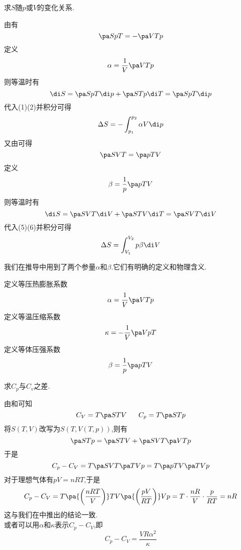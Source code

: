 \documentclass{ctexart}
\begin{document}
\begin{problem}[3F.2.4]
    求$S$随$p$或$V$的变化关系.
\end{problem}
\begin{solution}\setcounter{equation}{0}
    由有
    \begin{equation}
        \pa SpT=-\pa VTp
    \end{equation}
    定义
    \begin{equation}
        \alpha=\dfrac1V\pa VTp
    \end{equation}
    则等温时有
    \begin{equation}
        \di S=\pa SpT\di p+\pa STp\di T=\pa SpT\di p
    \end{equation}
    代入(1)(2)并积分可得
    \begin{equation}
        \Delta S=-\int_{p_1}^{p_2}\alpha V\di p
    \end{equation}
    又由可得
    \begin{equation}
        \pa SVT=\pa pTV
    \end{equation}
    定义
    \begin{equation}
        \beta=\dfrac1p\pa pTV
    \end{equation}
    则等温时有
    \begin{equation}
        \di S=\pa SVT\di V+\pa STV\di T=\pa SVT\di V
    \end{equation}
    代入(5)(6)并积分可得
    \begin{equation}
        \Delta S=\int_{V_1}^{V_2}p\beta\di V
    \end{equation}

\end{solution}
我们在推导中用到了两个参量$\alpha$和$\beta$.它们有明确的定义和物理含义.
\begin{definition}
    定义等压热膨胀系数
    \[\alpha=\dfrac1V\pa VTp\]
    定义等温压缩系数
    \[\kappa=-\dfrac1V\pa VpT\]
    定义等体压强系数
    \[\beta=\dfrac1p\pa pTV\]

\end{definition}
\begin{problem}[3F.2.6]
    求$C_p$与$C_v$之差.
\end{problem}
\begin{solution}
    由和可知
    \[C_V=T\pa STV\ \ \ \ \ C_p=T\pa STp\]
    将$S(T,V)$改写为$S(T,V(T,p))$,则有
    \[\pa STp=\pa STV+\pa SVT\pa VTp\]
    于是
    \[C_p-C_V=T\pa SVT\pa TVp=T\pa pTV\pa TVp\]
    对于理想气体有$pV=nRT$,于是
    \[C_p-C_V=T\pa{\left(\frac{nRT}{V}\right)}TV\pa{\left(\frac{pV}{RT}\right)}Vp
    =T\cdot\dfrac{nR}{V}\cdot\dfrac{p}{RT}=nR\]
    这与我们在中推出的结论一致.\\
    或者可以用$\alpha$和$\kappa$表示$C_p-C_V$,即
    \[C_p-C_V=\dfrac{VR\alpha^2}{\kappa}\]

\end{solution}
\end{document}
